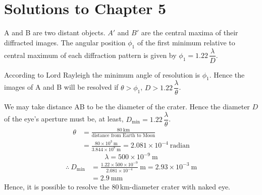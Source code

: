 \clearpage
\section*{Solutions to Chapter 5}


A and B are two distant objects. $A'$ and $B'$ are the central maxima of
their diffracted images. The angular position $\phi_1$ of the first minimum
relative to central maximum of each diffraction pattern is given by
$\phi_1 = 1.22\,\dfrac{\lambda}{D}$.

According to Lord Rayleigh the minimum angle of resolution is $\phi_1$.
Hence the images of A and B will be resolved if $\theta > \phi_1$,
$D > 1.22\,\dfrac{\lambda}{\theta}$.

We may take distance AB to be the diameter of the crater. Hence the
diameter $D$ of the eye's aperture must be, at least,
$D_{\min} = 1.22\,\dfrac{\lambda}{\theta}$.
\begin{align*}
\theta &= \frac{80\ \mathrm{km}}{\text{distance from Earth to Moon}}\\
&= \frac{80 \times 10^{3}\ \mathrm{m}}{3.844 \times 10^{8}\ \mathrm{m}}
 = 2.081 \times 10^{-4}\ \text{radian}
\end{align*}
\[ \lambda = 500 \times 10^{-9}\ \mathrm{m} \]
\begin{align*}
\therefore\ D_{\min}
&= \frac{1.22 \times 500 \times 10^{-9}}{2.081 \times 10^{-4}}\ \mathrm{m}
 = 2.93 \times 10^{-3}\ \mathrm{m}\\
&= 2.9\ \mathrm{mm}
\end{align*}
Hence, it is possible to resolve the 80\,km-diameter crater with naked eye.

